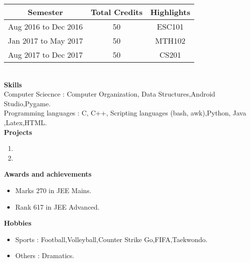 \documentclass[a4paper, 11pt]{article}
\begin{document}
\noindent
\begin{tabular}{|c|c|c|}
  \hline
  {\bf Semester} & {\bf Total Credits} & {\bf Highlights}\\
  \hline
  Aug 2016 to Dec 2016 & 50 & ESC101 \\
  \hline
  Jan 2017 to May 2017 & 50 & MTH102 \\
  \hline
  Aug 2017 to Dec 2017 & 50 & CS201 \\
  \hline
\end{tabular}
\vspace{0.3cm}
\\{\bf Skills}
\vspace{0.3cm}
\\Computer Sciecnce : Computer Organization, Data Structures,Android Studio,Pygame.
\\Programming languages : C, C++, Scripting languages (bash, awk),Python, Java ,Latex,HTML.
\vspace{0.3cm}
\\{\bf Projects}
\vspace{0.3cm}
\begin{enumerate}
\item \lipsum[6]
\item \lipsum[6]
\end{enumerate}
\vspace{0.3cm}
{\bf Awards and achievements}\\
\begin{itemize}
  \renewcommand{\labelitemi}{$-$}
    \item Marks 270 in JEE Mains.
    \item Rank 617 in JEE Advanced.
\end{itemize}
\vspace{0.3cm}
{\bf Hobbies}\\
\begin{itemize}
  \renewcommand{\labelitemi}{$-$}
    \item Sports : Football,Volleyball,Counter Strike Go,FIFA,Taekwondo.
    \item Others : Dramatics.
\end{itemize}

\vspace{0.3cm}
\end{document}
